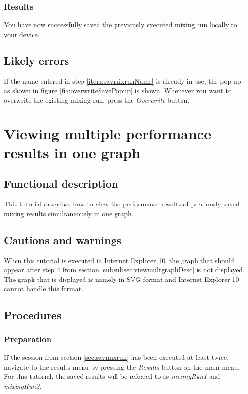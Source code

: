\subsubsection{Results}
You have now successfully saved the previously executed mixing run locally to your device.

\subsection{Likely errors}
If the name entered in step \ref{item:savmixrunName} is already in use, the pop-up as shown in figure \ref{fig:overwriteSavePopup} is shown. Whenever you want to overwrite the existing mixing run, press the \emph{Overwrite} button.


\section{Viewing multiple performance results in one graph}\label{sec:viewmultgraph}

\subsection{Functional description}
This tutorial describes how to view the performance results of previously saved mixing results simultaneously in one graph.

\subsection{Cautions and warnings}
When this tutorial is executed in Internet Explorer 10, the graph that should appear after step 4 from section \ref{subsubsec:viewmultgraphDesc} is not displayed. The graph that is displayed is namely in SVG format and Internet Explorer 10 cannot handle this format.

\subsection{Procedures}

\subsubsection{Preparation}
If the session from section \ref{sec:savmixrun} has been executed at least twice, navigate to the results menu by pressing the \emph{Results} button on the main menu. 
For this tutorial, the saved results will be referred to as \emph{mixingRun1} and \emph{mixingRun2}. 

